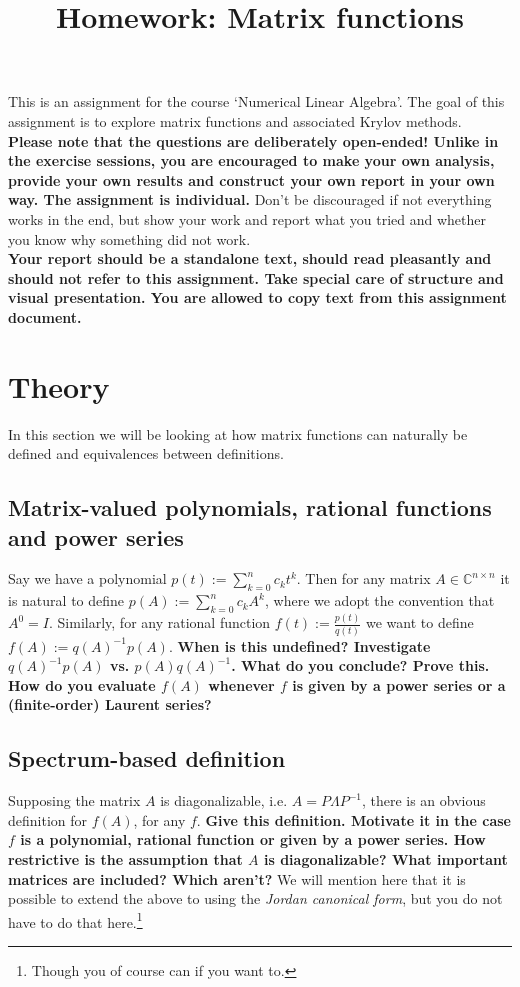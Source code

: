\documentclass[12pt]{article}
\title{Homework: Matrix functions} %
\begin{document}
\maketitle
This is an assignment for the course `Numerical Linear Algebra’. The goal of this assignment is to explore matrix functions and associated Krylov methods.\\
\textbf{Please note that the questions are deliberately open-ended! Unlike in the exercise sessions, you are encouraged to make your own analysis, provide your own results and
construct your own report in your own way. The assignment is individual.}
Don’t be discouraged if not everything works in the end, but show your work and report what you
tried and whether you know why something did not work.\\
\textbf{Your report should be a standalone text, should read pleasantly and should not refer to this assignment.
Take special care of structure and visual presentation. You are allowed to copy text from this assignment document.}

\section{Theory}
In this section we will be looking at how matrix functions can naturally be defined and equivalences between definitions.
\subsection{Matrix-valued polynomials, rational functions and power series}
Say we have a polynomial $p(t):=\sum_{k=0}^{n}c_kt^k$. Then for any matrix $A\in\mathbb{C}^{n\times n}$ it is natural to define $p(A):=\sum_{k=0}^{n}c_kA^k$, where we adopt the convention that $A^0=I$. Similarly, for any rational function $f(t) := \frac{p(t)}{q(t)}$ we want to define $f(A):=q(A)^{-1}p(A)$. \textbf{When is this undefined? Investigate $q(A)^{-1}p(A)$ vs. $p(A)q(A)^{-1}$. What do you conclude? Prove this. How do you evaluate $f(A)$ whenever $f$ is given by a power series or a (finite-order) Laurent series?}
\subsection{Spectrum-based definition}
Supposing the matrix $A$ is diagonalizable, i.e. $A=P\Lambda P^{-1}$, there is an obvious definition for $f(A)$, for any $f$. \textbf{Give this definition. Motivate it in the case $f$ is a polynomial, rational function or given by a power series. How restrictive is the assumption that $A$ is diagonalizable? What important matrices are included? Which aren't?} We will mention here that it is possible to extend the above to using the \emph{Jordan canonical form}, but you do not have to do that here.\footnote{Though you of course can if you want to.}
\end{document}
